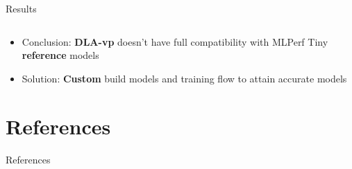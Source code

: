 \begin{frame}{Results}
\begin{table}[h]
\begin{tabular}{|l|l|c|c|c|c|}
\end{tabular}
\label{tab:benchmark-results}
\end{table}
\begin{itemize}
  \centering
  \item Conclusion: \textbf{DLA-vp} doesn't have full compatibility with MLPerf Tiny \textbf{reference} models
  \item Solution: \textbf{Custom} build models and training flow to attain accurate models
\end{itemize}

\end{frame}
\section{References}

\begin{frame}{References}
    \printbibliography[heading=none]
\end{frame}

